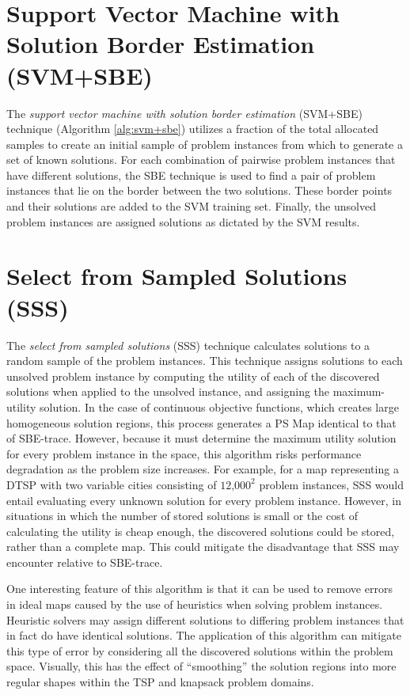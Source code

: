 \section{Support Vector Machine with Solution Border Estimation (SVM+SBE)}
The \textit{support vector machine with solution border estimation} (SVM+SBE) technique (Algorithm \ref{alg:svm+sbe}) utilizes a fraction of the total allocated samples to create an initial sample of problem instances from which to generate a set of known solutions.  For each combination of pairwise problem instances that have different solutions, the SBE technique is used to find a pair of problem instances that lie on the border between the two solutions.  These border points and their solutions are added to the SVM training set.  Finally, the unsolved problem instances are assigned solutions as dictated by the SVM results.

\section{Select from Sampled Solutions (SSS)}
\label{sec:sss}
The \textit{select from sampled solutions} (SSS) technique calculates solutions to a random sample of the problem instances.  This technique assigns solutions to each unsolved problem instance by computing the utility of each of the discovered solutions when applied to the unsolved instance, and assigning the maximum-utility solution.  In the case of continuous objective functions, which creates large homogeneous solution regions, this process generates a PS Map identical to that of SBE-trace.  However, because it must determine the maximum utility solution for every problem instance in the space, this algorithm risks performance degradation as the problem size increases.  For example, for a map representing a DTSP with two variable cities consisting of $\textrm{12,000}^{\textrm{2}}$ problem instances, SSS would entail evaluating every unknown solution for every problem instance.  However, in situations in which the number of stored solutions is small or the cost of calculating the utility is cheap enough, the discovered solutions could be stored, rather than a complete map.  This could mitigate the disadvantage that SSS may encounter relative to SBE-trace.

One interesting feature of this algorithm is that it can be used to remove errors in ideal maps caused by the use of heuristics when solving problem instances.  Heuristic solvers may assign different solutions to differing problem instances that in fact do have identical solutions. The  application of this algorithm can mitigate this type of error by considering all the discovered solutions within the problem space.  Visually, this has the effect of ``smoothing'' the solution regions into more regular shapes within the TSP and knapsack problem domains.


